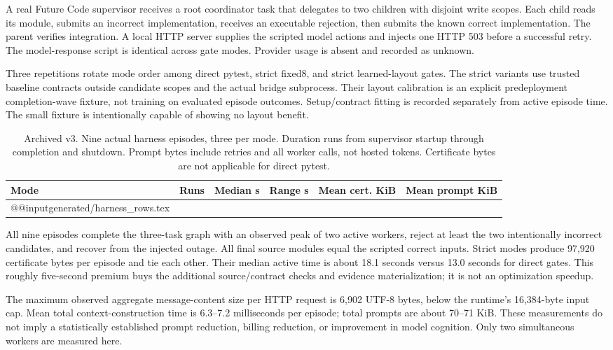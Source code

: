 A real Future Code supervisor receives a root coordinator task that delegates to two children with disjoint write scopes. Each child reads its module, submits an incorrect implementation, receives an executable rejection, then submits the known correct implementation. The parent verifies integration. A local HTTP server supplies the scripted model actions and injects one HTTP 503 before a successful retry. The model-response script is identical across gate modes. Provider usage is absent and recorded as unknown.

Three repetitions rotate mode order among direct pytest, strict fixed8, and strict learned-layout gates. The strict variants use trusted baseline contracts outside candidate scopes and the actual bridge subprocess. Their layout calibration is an explicit predeployment completion-wave fixture, not training on evaluated episode outcomes. Setup/contract fitting is recorded separately from active episode time. The small fixture is intentionally capable of showing no layout benefit.

\begin{table}[t]\centering\small
\caption{Archived v3. Nine actual harness episodes, three per mode. Duration runs from supervisor startup through completion and shutdown. Prompt bytes include retries and all worker calls, not hosted tokens. Certificate bytes are not applicable for direct pytest.}\label{tab:harness}
\begin{tabular}{@{}lrrrrr@{}}\toprule
Mode & Runs & Median s & Range s & Mean cert. KiB & Mean prompt KiB\\\midrule
\csname @@input\endcsname generated/harness_rows.tex 
\bottomrule\end{tabular}
\end{table}

All nine episodes complete the three-task graph with an observed peak of two active workers, reject at least the two intentionally incorrect candidates, and recover from the injected outage. All final source modules equal the scripted correct inputs. Strict modes produce 97,920 certificate bytes per episode and tie each other. Their median active time is about 18.1 seconds versus 13.0 seconds for direct gates. This roughly five-second premium buys the additional source/contract checks and evidence materialization; it is not an optimization speedup.

The maximum observed aggregate message-content size per HTTP request is 6,902 UTF-8 bytes, below the runtime's 16,384-byte input cap. Mean total context-construction time is 6.3--7.2 milliseconds per episode; total prompts are about 70--71 KiB. These measurements do not imply a statistically established prompt reduction, billing reduction, or improvement in model cognition. Only two simultaneous workers are measured here.

